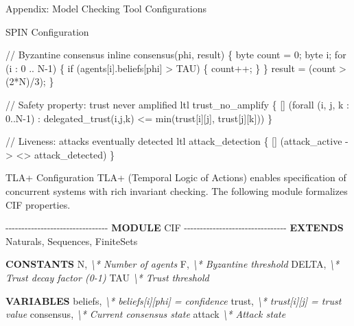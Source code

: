 \documentclass[
  ignorenonframetext,
]{beamer}
\newenvironment{Shaded}{}{}
\newcommand{\CommentTok}[1]{\textcolor[rgb]{0.38,0.63,0.69}{\textit{#1}}}
\newcommand{\KeywordTok}[1]{\textcolor[rgb]{0.00,0.44,0.13}{\textbf{#1}}}
\newcommand{\NormalTok}[1]{#1}
\begin{document}
\begin{frame}[fragile]{Appendix: Model Checking Tool Configurations}
\begin{block}{SPIN Configuration}
\begin{Shaded}
\begin{Highlighting}[]
\NormalTok{// Byzantine consensus}
\NormalTok{inline consensus(phi, result) \{}
\NormalTok{  byte count = 0;}
\NormalTok{  byte i;}
\NormalTok{  for (i : 0 .. N{-}1) \{}
\NormalTok{    if (agents[i].beliefs[phi] \textgreater{} TAU) \{}
\NormalTok{      count++;}
\NormalTok{    \}}
\NormalTok{  \}}
\NormalTok{  result = (count \textgreater{} (2*N)/3);}
\NormalTok{\}}

\NormalTok{// Safety property: trust never amplified}
\NormalTok{ltl trust\_no\_amplify \{}
\NormalTok{  [] (forall (i, j, k : 0..N{-}1) :}
\NormalTok{    delegated\_trust(i,j,k) \textless{}= min(trust[i][j], trust[j][k]))}
\NormalTok{\}}

\NormalTok{// Liveness: attacks eventually detected}
\NormalTok{ltl attack\_detection \{}
\NormalTok{  [] (attack\_active {-}\textgreater{} \textless{}\textgreater{} attack\_detected)}
\NormalTok{\}}
\end{Highlighting}
\end{Shaded}
\end{block}

\begin{block}{TLA+ Configuration}
\protect{}\label{sec:tla-config}
TLA+ (Temporal Logic of Actions) enables specification of concurrent
systems with rich invariant checking. The following module formalizes
CIF properties.

\begin{Shaded}
\begin{Highlighting}[]
\NormalTok{{-}{-}{-}{-}{-}{-}{-}{-}{-}{-}{-}{-}{-}{-}{-}{-}{-}{-}{-}{-}{-}{-}{-}{-}{-}{-}{-}{-}{-}{-}{-}{-} }\KeywordTok{MODULE}\NormalTok{ CIF {-}{-}{-}{-}{-}{-}{-}{-}{-}{-}{-}{-}{-}{-}{-}{-}{-}{-}{-}{-}{-}{-}{-}{-}{-}{-}{-}{-}{-}{-}{-}{-}}
\KeywordTok{EXTENDS}\NormalTok{ Naturals, Sequences, FiniteSets}

\KeywordTok{CONSTANTS}\NormalTok{ N,           }\CommentTok{\textbackslash{}* Number of agents}
\NormalTok{          F,           }\CommentTok{\textbackslash{}* Byzantine threshold}
\NormalTok{          DELTA,       }\CommentTok{\textbackslash{}* Trust decay factor (0{-}1)}
\NormalTok{          TAU          }\CommentTok{\textbackslash{}* Trust threshold}

\KeywordTok{VARIABLES}\NormalTok{ beliefs,     }\CommentTok{\textbackslash{}* beliefs[i][phi] = confidence}
\NormalTok{          trust,       }\CommentTok{\textbackslash{}* trust[i][j] = trust value}
\NormalTok{          consensus,   }\CommentTok{\textbackslash{}* Current consensus state}
\NormalTok{          attack       }\CommentTok{\textbackslash{}* Attack state}


\end{Highlighting}
\end{Shaded}
\end{block}
\end{frame}
\end{document}

